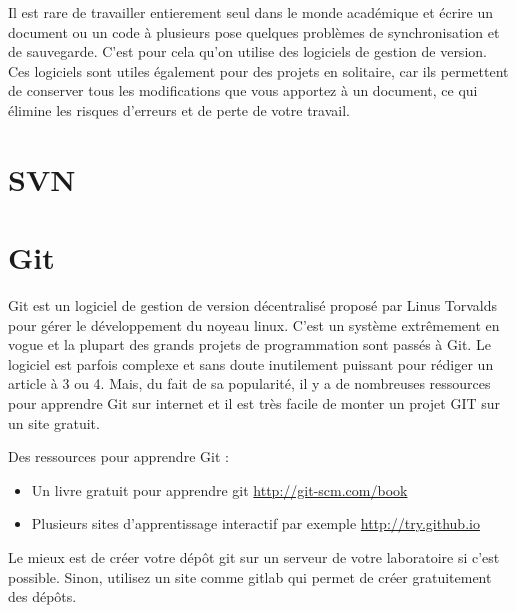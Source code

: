 Il est rare de travailler entierement seul dans le monde académique et écrire un document ou un code à plusieurs 
pose quelques problèmes de synchronisation et de sauvegarde. C'est pour cela qu'on utilise des logiciels de gestion de version.
Ces logiciels sont utiles également pour des projets en solitaire, car ils permettent de conserver tous les modifications
que vous apportez à un document, ce qui élimine les risques d'erreurs et de perte de votre travail. 


\section{SVN}


\section{Git}

Git est un logiciel de gestion de version décentralisé proposé par Linus Torvalds pour
gérer le développement du noyeau linux. C'est un système extrêmement en vogue et la plupart des
 grands projets de programmation sont passés à Git. Le logiciel est parfois complexe et sans doute
 inutilement puissant pour rédiger un article à 3 ou 4. Mais, du fait de sa popularité, il y a de nombreuses
 ressources pour apprendre Git sur internet et il est très facile de monter un projet GIT sur un site gratuit.
 
 
 Des ressources pour apprendre Git :
 \begin{itemize}
  \item Un livre gratuit pour apprendre git \url{http://git-scm.com/book}
  \item Plusieurs sites d'apprentissage interactif par exemple  \url{http://try.github.io}
 \end{itemize}

 
 Le mieux est de créer votre dépôt git sur un serveur de votre laboratoire si c'est possible.
 Sinon, utilisez un site comme gitlab qui permet de créer gratuitement des dépôts.